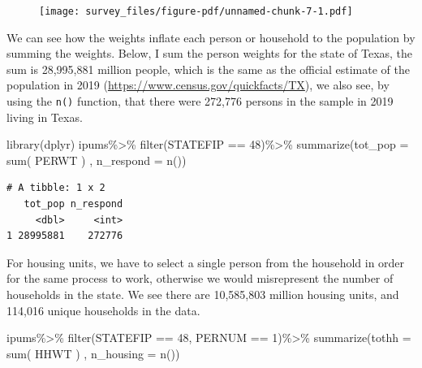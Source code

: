 \documentclass[
  letterpaper,
  DIV=11,
  numbers=noendperiod]{scrreprt}
\newenvironment{Shaded}{\begin{snugshade}}{\end{snugshade}}
\newcommand{\AttributeTok}[1]{\textcolor[rgb]{0.40,0.45,0.13}{#1}}
\newcommand{\DecValTok}[1]{\textcolor[rgb]{0.68,0.00,0.00}{#1}}
\newcommand{\FunctionTok}[1]{\textcolor[rgb]{0.28,0.35,0.67}{#1}}
\newcommand{\NormalTok}[1]{\textcolor[rgb]{0.00,0.23,0.31}{#1}}
\newcommand{\SpecialCharTok}[1]{\textcolor[rgb]{0.37,0.37,0.37}{#1}}
\begin{document}
\begin{figure}[H]

{\centering \texttt{[image: survey\_files/figure-pdf/unnamed-chunk-7-1.pdf]}

}

\end{figure}

We can see how the weights inflate each person or household to the
population by summing the weights. Below, I sum the person weights for
the state of Texas, the sum is 28,995,881 million people, which is the
same as the official estimate of the population in 2019
(\url{https://www.census.gov/quickfacts/TX}), we also see, by using the
\texttt{n()} function, that there were 272,776 persons in the sample in
2019 living in Texas.

\begin{Shaded}
\begin{Highlighting}[]
\FunctionTok{library}\NormalTok{(dplyr)}
\NormalTok{ipums}\SpecialCharTok{\%\textgreater{}\%}
  \FunctionTok{filter}\NormalTok{(STATEFIP }\SpecialCharTok{==} \DecValTok{48}\NormalTok{)}\SpecialCharTok{\%\textgreater{}\%}
  \FunctionTok{summarize}\NormalTok{(}\AttributeTok{tot\_pop =} \FunctionTok{sum}\NormalTok{( PERWT ) , }\AttributeTok{n\_respond =} \FunctionTok{n}\NormalTok{())}
\end{Highlighting}
\end{Shaded}

\begin{verbatim}
# A tibble: 1 x 2
   tot_pop n_respond
     <dbl>     <int>
1 28995881    272776
\end{verbatim}

For housing units, we have to select a single person from the household
in order for the same process to work, otherwise we would misrepresent
the number of households in the state. We see there are 10,585,803
million housing units, and 114,016 unique households in the data.

\begin{Shaded}
\begin{Highlighting}[]
\NormalTok{ipums}\SpecialCharTok{\%\textgreater{}\%}
  \FunctionTok{filter}\NormalTok{(STATEFIP }\SpecialCharTok{==} \DecValTok{48}\NormalTok{,}
\NormalTok{         PERNUM }\SpecialCharTok{==} \DecValTok{1}\NormalTok{)}\SpecialCharTok{\%\textgreater{}\%}
  \FunctionTok{summarize}\NormalTok{(}\AttributeTok{tothh =} \FunctionTok{sum}\NormalTok{( HHWT ) , }\AttributeTok{n\_housing =} \FunctionTok{n}\NormalTok{())}
\end{Highlighting}
\end{Shaded}
\end{document}
